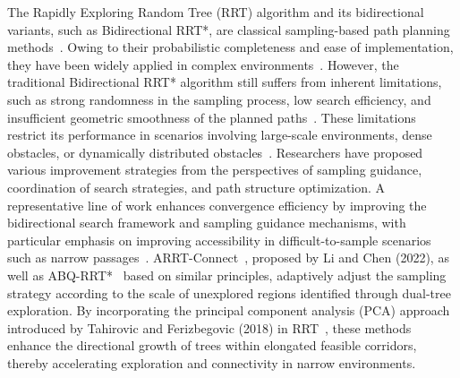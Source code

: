 \documentclass[sn-mathphys-num]{sn-jnl}%
\begin{document}
The Rapidly Exploring Random Tree (RRT) algorithm and its bidirectional variants, such as Bidirectional RRT*, are classical sampling-based path planning methods~\cite{elbanhawi2014sampling,karaman2011sampling}. Owing to their probabilistic completeness and ease of implementation, they have been widely applied in complex environments~\cite{lavalle1998rapidly, lavalle2001randomized}. However, the traditional Bidirectional RRT* algorithm still suffers from inherent limitations, such as strong randomness in the sampling process, low search efficiency, and insufficient geometric smoothness of the planned paths~\cite{kuffner2000rrt,gammell2021asymptotically}. These limitations restrict its performance in scenarios involving large-scale environments, dense obstacles, or dynamically distributed obstacles~\cite{qureshi2015intelligent,ding2023improved}. Researchers have proposed various improvement strategies from the perspectives of sampling guidance, coordination of search strategies, and path structure optimization. A representative line of work enhances convergence efficiency by improving the bidirectional search framework and sampling guidance mechanisms, with particular emphasis on improving accessibility in difficult-to-sample scenarios such as narrow passages~\cite{noreen2016optimal}. ARRT-Connect~\cite{li2021adaptive}, proposed by Li and Chen (2022), as well as ABQ-RRT*~\cite{huang2024adaptive} based on similar principles, adaptively adjust the sampling strategy according to the scale of unexplored regions identified through dual-tree exploration. By incorporating the principal component analysis (PCA) approach introduced by Tahirovic and Ferizbegovic (2018) in RRT~\cite{tahirovic2018rapidly}, these methods enhance the directional growth of trees within elongated feasible corridors, thereby accelerating exploration and connectivity in narrow environments.
\end{document}
